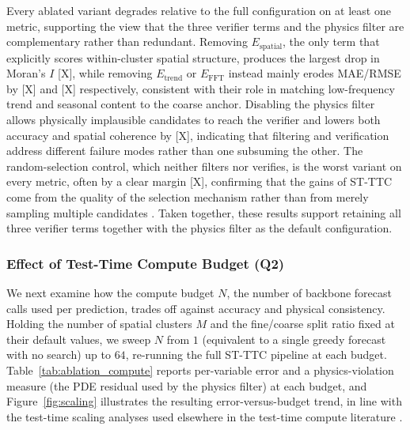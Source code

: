 \documentclass[preprint,12pt]{elsarticle}
\begin{document}
Every ablated variant degrades relative to the full configuration on at least one metric, supporting the view that the three verifier terms and the physics filter are complementary rather than redundant. Removing $E_{\text{spatial}}$, the only term that explicitly scores within-cluster spatial structure, produces the largest drop in Moran's $I$ [X], while removing $E_{\text{trend}}$ or $E_{\text{FFT}}$ instead mainly erodes MAE/RMSE by [X] and [X] respectively, consistent with their role in matching low-frequency trend and seasonal content to the coarse anchor. Disabling the physics filter allows physically implausible candidates to reach the verifier and lowers both accuracy and spatial coherence by [X], indicating that filtering and verification address different failure modes rather than one subsuming the other. The random-selection control, which neither filters nor verifies, is the worst variant on every metric, often by a clear margin [X], confirming that the gains of ST-TTC come from the quality of the selection mechanism rather than from merely sampling multiple candidates \citep{snell2024scaling,cobbe2021verifiers}. Taken together, these results support retaining all three verifier terms together with the physics filter as the default configuration.

\subsubsection{Effect of Test-Time Compute Budget (Q2)}
\label{sec:ablation_compute}

We next examine how the compute budget $N$, the number of backbone forecast calls used per prediction, trades off against accuracy and physical consistency. Holding the number of spatial clusters $M$ and the fine/coarse split ratio fixed at their default values, we sweep $N$ from $1$ (equivalent to a single greedy forecast with no search) up to $64$, re-running the full ST-TTC pipeline at each budget. Table~\ref{tab:ablation_compute} reports per-variable error and a physics-violation measure (the PDE residual used by the physics filter) at each budget, and Figure~\ref{fig:scaling} illustrates the resulting error-versus-budget trend, in line with the test-time scaling analyses used elsewhere in the test-time compute literature \citep{snell2024scaling,huang2025bestofn,le2026scaler}.
\end{document}
